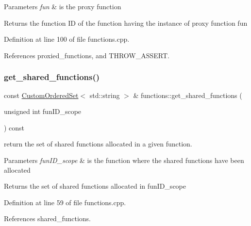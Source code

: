 \begin{DoxyParams}{Parameters}
{\em fun} & is the proxy function \\
\hline
\end{DoxyParams}
\begin{DoxyReturn}{Returns}
the function ID of the function having the instance of proxy function fun 
\end{DoxyReturn}


Definition at line 100 of file functions.\+cpp.



References proxied\+\_\+functions, and T\+H\+R\+O\+W\+\_\+\+A\+S\+S\+E\+RT.

\mbox{\label{classfunctions_ab435b6f8df7ea1ddeabd35a2d73e7242}} 
\subsubsection{\texorpdfstring{get\+\_\+shared\+\_\+functions()}{get\_shared\_functions()}}
{\footnotesize\ttfamily const \hyperlink{classCustomOrderedSet}{Custom\+Ordered\+Set}$<$ std\+::string $>$ \& functions\+::get\+\_\+shared\+\_\+functions (\begin{DoxyParamCaption}\item[{unsigned int}]{fun\+I\+D\+\_\+scope }\end{DoxyParamCaption}) const}



return the set of shared functions allocated in a given function. 


\begin{DoxyParams}{Parameters}
{\em fun\+I\+D\+\_\+scope} & is the function where the shared functions have been allocated \\
\hline
\end{DoxyParams}
\begin{DoxyReturn}{Returns}
the set of shared functions allocated in fun\+I\+D\+\_\+scope 
\end{DoxyReturn}


Definition at line 59 of file functions.\+cpp.



References shared\+\_\+functions.

\mbox{\label{classfunctions_a97f9fd743ecd37a8538880ecd21e09c7}} 
